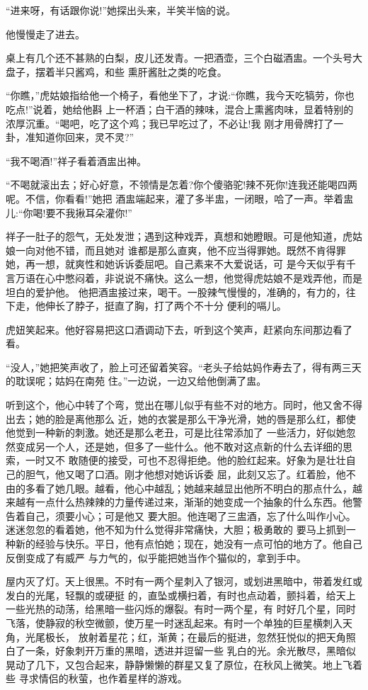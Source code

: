 \documentclass[11pt,a4paper,onecolumn]{article}
\begin{document}
``进来呀，有话跟你说!''她探出头来，半笑半恼的说。

他慢慢走了进去。

桌上有几个还不甚熟的白梨，皮儿还发青。一把酒壶，三个白磁酒盅。一个头号大盘子，摆着半只酱鸡，和些
熏肝酱肚之类的吃食。

``你瞧，''虎姑娘指给他一个椅子，看他坐下了，才说:``你瞧，我今天吃犒劳，你也吃点!''说着，她给他斟
上一杯酒；白干酒的辣味，混合上熏酱肉味，显着特别的浓厚沉重。``喝吧，吃了这个鸡；我已早吃过了，不必让!我
刚才用骨牌打了一卦，准知道你回来，灵不灵?''

``我不喝酒!''祥子看着酒盅出神。

``不喝就滚出去；好心好意，不领情是怎着?你个傻骆驼!辣不死你!连我还能喝四两呢。不信，你看看!''她把
酒盅端起来，灌了多半盅，一闭眼，哈了一声。举着盅儿:``你喝!要不我揪耳朵灌你!''

祥子一肚子的怨气，无处发泄；遇到这种戏弄，真想和她瞪眼。可是他知道，虎姑娘一向对他不错，而且她对
谁都是那么直爽，他不应当得罪她。既然不肯得罪她，再一想，就爽性和她诉诉委屈吧。自己素来不大爱说话，可
是今天似乎有千言万语在心中憋闷着，非说说不痛快。这么一想，他觉得虎姑娘不是戏弄他，而是坦白的爱护他。
他把酒盅接过来，喝干。一股辣气慢慢的，准确的，有力的，往下走，他伸长了脖子，挺直了胸，打了两个不十分
便利的嗝儿。

虎妞笑起来。他好容易把这口酒调动下去，听到这个笑声，赶紧向东间那边看了看。

``没人，''她把笑声收了，脸上可还留着笑容。``老头子给姑妈作寿去了，得有两三天的耽误呢；姑妈在南苑
住。''一边说，一边又给他倒满了盅。

听到这个，他心中转了个弯，觉出在哪儿似乎有些不对的地方。同时，他又舍不得出去；她的脸是离他那么
近，她的衣裳是那么干净光滑，她的唇是那么红，都使他觉到一种新的刺激。她还是那么老丑，可是比往常添加了
一些活力，好似她忽然变成另一个人，还是她，但多了一些什么。他不敢对这点新的什么去详细的思索，一时又不
敢随便的接受，可也不忍得拒绝。他的脸红起来。好象为是壮壮自己的胆气，他又喝了口酒。刚才他想对她诉诉委
屈，此刻又忘了。红着脸，他不由的多看了她几眼。越看，他心中越乱；她越来越显出他所不明白的那点什么，越
来越有一点什么热辣辣的力量传递过来，渐渐的她变成一个抽象的什么东西。他警告着自己，须要小心；可是他又
要大胆。他连喝了三盅酒，忘了什么叫作小心。迷迷忽忽的看着她，他不知为什么觉得非常痛快，大胆；极勇敢的
要马上抓到一种新的经验与快乐。平日，他有点怕她；现在，她没有一点可怕的地方了。他自己反倒变成了有威严
与力气的，似乎能把她当作个猫似的，拿到手中。

屋内灭了灯。天上很黑。不时有一两个星刺入了银河，或划进黑暗中，带着发红或发白的光尾，轻飘的或硬挺
的，直坠或横扫着，有时也点动着，颤抖着，给天上一些光热的动荡，给黑暗一些闪烁的爆裂。有时一两个星，有
时好几个星，同时飞落，使静寂的秋空微颤，使万星一时迷乱起来。有时一个单独的巨星横刺入天角，光尾极长，
放射着星花；红，渐黄；在最后的挺进，忽然狂悦似的把天角照白了一条，好象刺开万重的黑暗，透进并逗留一些
乳白的光。余光散尽，黑暗似晃动了几下，又包合起来，静静懒懒的群星又复了原位，在秋风上微笑。地上飞着些
寻求情侣的秋萤，也作着星样的游戏。
\end{document}
